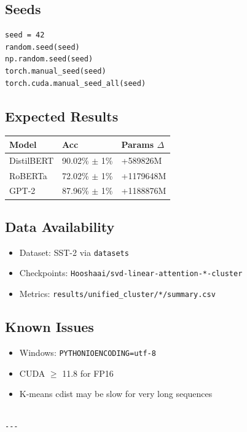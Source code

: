 \subsection{Seeds}

\begin{lstlisting}
seed = 42
random.seed(seed)
np.random.seed(seed)
torch.manual_seed(seed)
torch.cuda.manual_seed_all(seed)
\end{lstlisting}

\subsection{Expected Results}

\begin{table}[H]
\centering
\small
\begin{tabular}{lll}
\toprule
\textbf{Model} & \textbf{Acc} & \textbf{Params $\Delta$} \\
\midrule
DistilBERT & 90.02\% $\pm$ 1\% & +589826M \\
RoBERTa & 72.02\% $\pm$ 1\% & +1179648M \\
GPT-2 & 87.96\% $\pm$ 1\% & +1188876M \\
\bottomrule
\end{tabular}
\end{table}

\subsection{Data Availability}

\begin{itemize}
\item Dataset: SST-2 via \texttt{datasets}
\item Checkpoints: \texttt{Hooshaai/svd-linear-attention-*-cluster}
\item Metrics: \texttt{results/unified\_cluster/*/summary.csv}

\end{itemize}
\subsection{Known Issues}

\begin{itemize}
\item Windows: \texttt{PYTHONIOENCODING=utf-8}
\item CUDA $\ge$ 11.8 for FP16
\item K-means cdist may be slow for very long sequences
\end{itemize}
\begin{lstlisting}

---
\end{lstlisting}